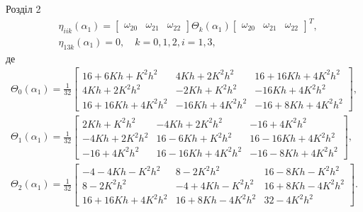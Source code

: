 \documentclass[handout, 8pt]{beamer}
\numberwithin{figure}{section}
\numberwithin{equation}{section}
\numberwithin{table}{section}
\begin{document}
\begin{frame}{Розділ 2}
\begin{equation}
\begin{aligned}
&\eta_{iik}\left(\alpha_1\right)=\left[\begin{array}{ccc}
\omega_{20} & \omega_{21} & \omega_{22}
\end{array} \right] \Theta_k\left(\alpha_1\right) \left[\begin{array}{ccc}
\omega_{20} & \omega_{21} & \omega_{22}
\end{array} \right]^T,\\
&\eta_{13k}\left(\alpha_1\right)=0, \quad k=0,1,2, i=1,3,
\end{aligned}
\end{equation}
де
\begin{equation}\label{eq:sqt_strain_nl}
\begin{aligned}
\Theta_0\left(\alpha_1\right)=\frac{1}{32}
\left[
\begin{array}{ccc}
16+6Kh+K^2h^2 & 4Kh+2K^2h^2 & 16+16Kh+4K^2h^2 \\ 
4Kh+2K^2h^2 & -2Kh+K^2h^2 & -16Kh+4K^2h^2 \\ 
16+16Kh+4K^2h^2 & -16Kh+4K^2h^2 & -16+8Kh+4K^2h^2
\end{array}
\right],\\
\Theta_1\left(\alpha_1\right)=\frac{1}{32}
\left[
\begin{array}{ccc}
2Kh+K^2h^2 & -4Kh+2K^2h^2 & -16+4K^2h^2 \\ 
-4Kh+2K^2h^2 & 16-6Kh+K^2h^2 & 16-16Kh+4K^2h^2 \\ 
-16+4K^2h^2  & 16-16Kh+4K^2h^2 & -16-8Kh+4K^2h^2
\end{array}
\right],\\
\Theta_2\left(\alpha_1\right)=\frac{1}{32}
\left[
\begin{array}{ccc}
-4-4Kh-K^2h^2 & 8-2K^2h^2 & 16-8Kh-K^2h^2 \\ 
8-2K^2h^2 & -4+4Kh-K^2h^2 & 16+8Kh-4K^2h^2 \\ 
16+16Kh+4K^2h^2 & 16+8Kh-4K^2h^2 & 32-4K^2h^2
\end{array}
\right].\\
\end{aligned}
\end{equation}

\end{frame}
\end{document}
